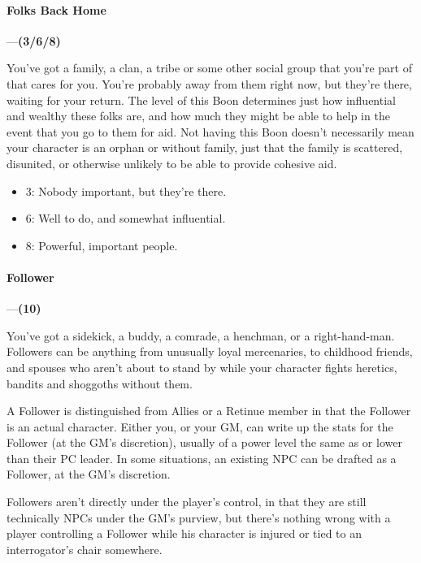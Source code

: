\documentclass[oneside,11pt,english]{book}
\begin{document}
\paragraph{\label{boon:Folks Back Home}Folks Back Home}---\quad\textbf{(3/6/8)}\par
You've got a family, a clan, a tribe or some other social group that you're part of that cares for you. You're 
probably away from them right now, but they're there, waiting for your return. The level of this Boon 
determines just how influential and wealthy these folks are, and how much they might be able to help in 
the event that you go to them for aid. Not having this Boon doesn't necessarily mean your character is an 
orphan or without family, just that the family is scattered, disunited, or otherwise unlikely to be able to 
provide cohesive aid. 
\begin{itemize}
\item 3: Nobody important, but they’re there. 
\item 6: Well to do, and somewhat influential. 
\item 8: Powerful, important people.
\end{itemize}
\paragraph{\label{boon:Follower}Follower}---\quad\textbf{(10)}\par
You've got a sidekick, a buddy, a comrade, a henchman, or a right-hand-man. Followers can be anything 
from unusually loyal mercenaries, to childhood friends, and spouses who aren't about to stand by while 
your character fights heretics, bandits and shoggoths without them. 

 

A Follower is distinguished from Allies or a Retinue member in that the Follower is an actual character. 
Either you, or your GM, can write up the stats for the Follower (at the GM's discretion), usually of a 
power level the same as or lower than their PC leader. In some situations, an existing NPC can be drafted 
as a Follower, at the GM's discretion. 

 

Followers aren't directly under the player's control, in that they are still technically NPCs under the GM's 
purview, but there's nothing wrong with a player controlling a Follower while his character is injured or 
tied to an interrogator's chair somewhere. 

 
\end{document}
